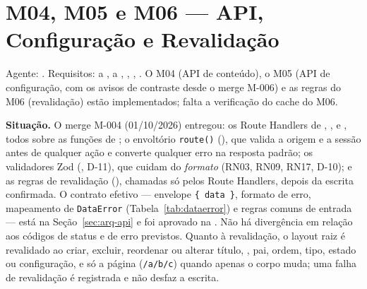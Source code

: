 



\section{M04, M05 e M06 --- API, Configuração e Revalidação}\label{sec:impl-api}

\noindent{}\quad Agente: . Requisitos:  a ,  a , , , . O M04 (API de conteúdo), o M05 (API de configuração, com os avisos de contraste desde o merge M-006) e as regras do M06 (revalidação) estão implementados; falta a verificação do cache do M06.

\textbf{Situação.} O merge M-004 (01/10/2026) entregou: os Route Handlers de , ,  e , todos sobre as funções de ; o envoltório \texttt{route()} (), que valida a origem e a sessão antes de qualquer ação e converte qualquer erro na resposta padrão; os validadores Zod (, D-11), que cuidam do \emph{formato} (RN03, RN09, RN17, D-10); e as regras de revalidação (), chamadas só pelos Route Handlers, depois da escrita confirmada. O contrato efetivo --- envelope \texttt{\{ data \}}, formato de erro, mapeamento de \texttt{DataError} (Tabela~\ref{tab:dataerror}) e regras comuns de entrada --- está na Seção~\ref{sec:arq-api} e foi aprovado na . Não há divergência em relação aos códigos de status e de erro previstos. Quanto à revalidação, o layout raiz é revalidado ao criar, excluir, reordenar ou alterar título, , pai, ordem, tipo, estado ou configuração, e só a página (\texttt{/a/b/c}) quando apenas o corpo muda; uma falha de revalidação é registrada e não desfaz a escrita.

